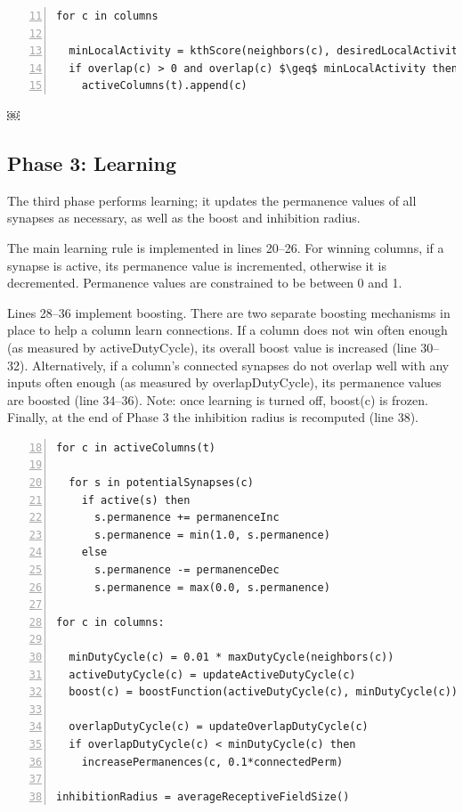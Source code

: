 \documentclass{report}
\begin{document}
\begin{lstlisting}[numbers=left,firstnumber=11,mathescape]
for c in columns

  minLocalActivity = kthScore(neighbors(c), desiredLocalActivity)
  if overlap(c) > 0 and overlap(c) $\geq$ minLocalActivity then
    activeColumns(t).append(c)

\end{lstlisting}￼

\subsection*{Phase 3: Learning}
The third phase performs learning; it updates the permanence values of
all synapses as necessary, as well as the boost and inhibition radius.

The main learning rule is implemented in lines 20--26. For winning
columns, if a synapse is active, its permanence value is incremented,
otherwise it is decremented. Permanence values are constrained to be
between 0 and 1.

Lines 28--36 implement boosting. There are two separate boosting
mechanisms in place to help a column learn connections. If a column
does not win often enough (as measured by activeDutyCycle), its
overall boost value is increased (line 30--32). Alternatively, if a
column's connected synapses do not overlap well with any inputs often
enough (as measured by overlapDutyCycle), its permanence values are
boosted (line 34--36). Note: once learning is turned off, boost(c) is
frozen.  Finally, at the end of Phase 3 the inhibition radius is
recomputed (line 38).

\begin{lstlisting}[numbers=left,firstnumber=18]
for c in activeColumns(t)

  for s in potentialSynapses(c)
    if active(s) then
      s.permanence += permanenceInc
      s.permanence = min(1.0, s.permanence)
    else
      s.permanence -= permanenceDec
      s.permanence = max(0.0, s.permanence)

for c in columns:

  minDutyCycle(c) = 0.01 * maxDutyCycle(neighbors(c))
  activeDutyCycle(c) = updateActiveDutyCycle(c)
  boost(c) = boostFunction(activeDutyCycle(c), minDutyCycle(c))

  overlapDutyCycle(c) = updateOverlapDutyCycle(c)
  if overlapDutyCycle(c) < minDutyCycle(c) then
    increasePermanences(c, 0.1*connectedPerm)

inhibitionRadius = averageReceptiveFieldSize()

\end{lstlisting}
\end{document}
